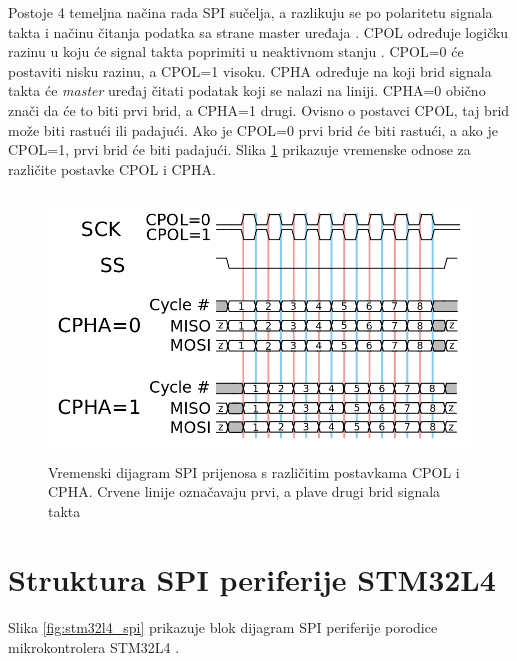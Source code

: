 Postoje 4 temeljna načina rada  SPI sučelja, a razlikuju se po polaritetu signala takta  i  načinu čitanja podatka sa strane master uređaja . CPOL određuje logičku razinu u koju će signal takta poprimiti u neaktivnom stanju . CPOL=0 će postaviti nisku razinu, a CPOL=1 visoku. CPHA određuje na koji brid signala takta će \textit{master} uređaj čitati podatak koji se nalazi na liniji. CPHA=0 obično znači da će to biti prvi brid, a CPHA=1 drugi. Ovisno o postavci CPOL, taj brid može biti rastući ili padajući. Ako je CPOL=0 prvi brid će biti rastući, a ako je CPOL=1, prvi brid će biti padajući. Slika \ref{fig:spi_cpol_cpha} prikazuje vremenske odnose za različite postavke CPOL i CPHA.

\begin{figure}[htb]
	\centering
	\includegraphics[height=7cm]{slike/spi_cpol_cpha.png}
	\caption{Vremenski dijagram SPI prijenosa s različitim postavkama CPOL i CPHA. Crvene linije označavaju prvi, a plave drugi brid  signala takta \cite{spi_wikipedia}}
	\label{fig:spi_cpol_cpha}
\end{figure}

\section{Struktura SPI periferije STM32L4}
Slika \ref{fig:stm32l4_spi} prikazuje blok dijagram SPI periferije porodice mikrokontrolera STM32L4 \cite{stm32l4_manual}.

